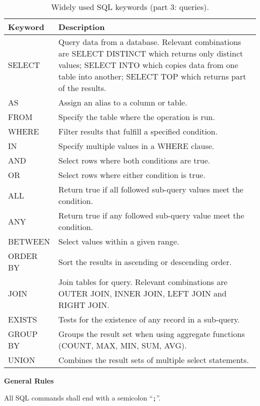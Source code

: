 \begin{table}
	\centering \caption{Widely used SQL keywords (part 3: queries).}\label{ch:db:tab:sqlkeywords3}
	\begin{tabularx}{\textwidth}{lX}
		\hline
		Keyword & Description \\ \hline
		SELECT & Query data from a database. Relevant combinations are SELECT DISTINCT which returns only distinct values; SELECT INTO which copies data from one table into another; SELECT TOP which returns part of the results. \\ \hdashline
		AS & Assign an alias to a column or table. \\ \hdashline
		FROM & Specify the table where the operation is run. \\ \hdashline
		WHERE & Filter results that fulfill a specified condition. \\ \hdashline
		IN & Specify multiple values in a WHERE clause. \\ \hdashline
		AND & Select rows where both conditions are true. \\ \hdashline
		OR & Select rows where either condition is true. \\ \hdashline
		ALL & Return true if all followed sub-query values meet the condition. \\ \hdashline
		ANY & Return true if any followed sub-query value meet the condition. \\ \hdashline
		BETWEEN & Select values within a given range. \\ \hdashline
		ORDER BY & Sort the results in ascending or descending order. \\ \hdashline
		JOIN & Join tables for query. Relevant combinations are OUTER JOIN, INNER JOIN, LEFT JOIN and RIGHT JOIN. \\ \hdashline
		EXISTS & Tests for the existence of any record in a sub-query. \\ \hdashline
		GROUP BY & Groups the result set when using aggregate functions (COUNT, MAX, MIN, SUM, AVG). \\ \hdashline
		UNION & Combines the result sets of multiple select statements. \\
		 \hline
	\end{tabularx}
\end{table}

\vspace{0.1in}
\noindent \textbf{General Rules}
\vspace{0.1in}

All SQL commands shall end with a semicolon ``\verb|;|''.


